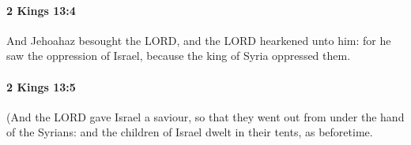		\paragraph{2 Kings 13:4} %
			\label{2KINGS-13-4}

			And Jehoahaz besought the LORD, and the LORD hearkened unto him: for he saw the oppression of Israel, because the king of Syria oppressed them.


		\paragraph{2 Kings 13:5} %
			\label{2KINGS-13-5}

			(And the LORD gave Israel a saviour, so that they went out from under the hand of the Syrians: and the children of Israel dwelt in their tents, as beforetime.


